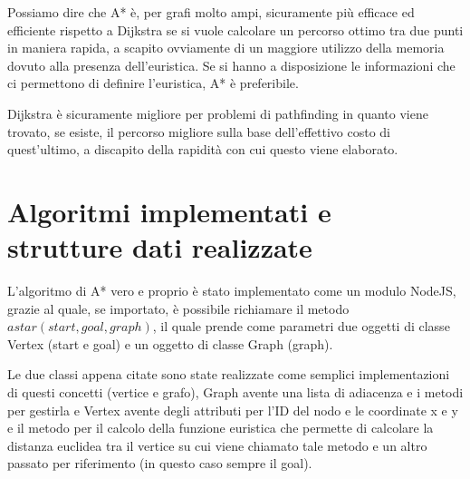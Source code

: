 \documentclass[12pt,a4paper]{report}
\begin{document}
Possiamo dire che A* è, per grafi molto ampi, sicuramente più efficace ed efficiente rispetto a Dijkstra se si vuole calcolare un percorso ottimo tra due punti in maniera rapida, a scapito ovviamente di un maggiore utilizzo della memoria dovuto alla presenza dell'euristica. Se si hanno a disposizione le informazioni che ci permettono di definire l'euristica, A* è preferibile.

Dijkstra è sicuramente migliore per problemi di pathfinding in quanto viene trovato, se esiste, il percorso migliore sulla base dell'effettivo costo di quest'ultimo, a discapito della rapidità con cui questo viene elaborato.

\chapter{Algoritmi implementati e\\strutture dati realizzate}

L'algoritmo di A* vero e proprio è stato implementato come un modulo NodeJS, grazie al quale, se importato, è possibile richiamare il metodo \(astar(start, goal, graph)\), il quale prende come parametri due oggetti di classe Vertex (start e goal) e un oggetto di classe Graph (graph).


Le due classi appena citate sono state realizzate come semplici implementazioni di questi concetti (vertice e grafo), Graph avente una lista di adiacenza e i metodi per gestirla e Vertex avente degli attributi per l'ID del nodo e le coordinate x e y e il metodo per il calcolo della funzione euristica che permette di calcolare la distanza euclidea tra il vertice su cui viene chiamato tale metodo e un altro passato per riferimento (in questo caso sempre il goal).
\\
\end{document}
